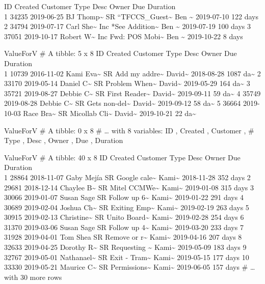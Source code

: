 \documentclass[]{article}
\begin{document}
ID Created Customer Type Desc Owner Due Duration \\
1 34235 2019-06-25 BJ Thomp\textasciitilde{} SR
``TFCCS\_Guest\textasciitilde{} Ben \textasciitilde{} 2019-07-10 122
days 2 34794 2019-07-17 Carl She\textasciitilde{} Inc *See
Addition\textasciitilde{} Ben \textasciitilde{} 2019-07-19 100 days 3
37051 2019-10-17 Robert W\textasciitilde{} Inc Fwd: POS
Mobi\textasciitilde{} Ben \textasciitilde{} 2019-10-22 8 days

\pagebreak
ValueForV \# A tibble: 5 x 8 ID Created Customer Type Desc Owner Due
Duration \\
1 10739 2016-11-02 Kami Eva\textasciitilde{} SR Add my
addre\textasciitilde{} David\textasciitilde{} 2018-08-28 1087
da\textasciitilde{} 2 33170 2019-05-14 Daniel C\textasciitilde{} SR
Problem When\textasciitilde{} David\textasciitilde{} 2019-05-29 164
da\textasciitilde{} 3 35721 2019-08-27 Debbie C\textasciitilde{} SR
First Reader\textasciitilde{} David\textasciitilde{} 2019-09-11 59
da\textasciitilde{} 4 35749 2019-08-28 Debbie C\textasciitilde{} SR Gets
non-del\textasciitilde{} David\textasciitilde{} 2019-09-12 58
da\textasciitilde{} 5 36664 2019-10-03 Race Bra\textasciitilde{} SR
Micollab Cli\textasciitilde{} David\textasciitilde{} 2019-10-21 22
da\textasciitilde{}

\pagebreak
ValueForV \# A tibble: 0 x 8 \# \ldots{} with 8 variables: ID , Created
, Customer , \# Type , Desc , Owner , Due , Duration

\pagebreak
ValueForV \# A tibble: 40 x 8 ID Created Customer Type Desc Owner Due
Duration \\
1 28864 2018-11-07 Gaby Mejía SR Google cale\textasciitilde{}
Kami\textasciitilde{} 2018-11-28 352 days 2 29681 2018-12-14 Chaylee
B\textasciitilde{} SR Mitel CCMWe\textasciitilde{} Kami\textasciitilde{}
2019-01-08 315 days 3 30066 2019-01-07 Susan Sage SR Follow up
6\textasciitilde{} Kami\textasciitilde{} 2019-01-22 291 days 4 30689
2019-02-04 Joshua Ch\textasciitilde{} SR Exiting Emp\textasciitilde{}
Kami\textasciitilde{} 2019-02-19 263 days 5 30915 2019-02-13
Christine\textasciitilde{} SR Unito Board\textasciitilde{}
Kami\textasciitilde{} 2019-02-28 254 days 6 31370 2019-03-06 Susan Sage
SR Follow up 4\textasciitilde{} Kami\textasciitilde{} 2019-03-20 233
days 7 31928 2019-04-01 Tom Shea SR Remove or r\textasciitilde{}
Kami\textasciitilde{} 2019-04-16 207 days 8 32633 2019-04-25 Dorothy
R\textasciitilde{} SR Requesting \textasciitilde{} Kami\textasciitilde{}
2019-05-09 183 days 9 32767 2019-05-01 Nathanael\textasciitilde{} SR
Exit - Tram\textasciitilde{} Kami\textasciitilde{} 2019-05-15 177 days
10 33330 2019-05-21 Maurice C\textasciitilde{} SR
Permissions\textasciitilde{} Kami\textasciitilde{} 2019-06-05 157 days
\# \ldots{} with 30 more rows
\end{document}
